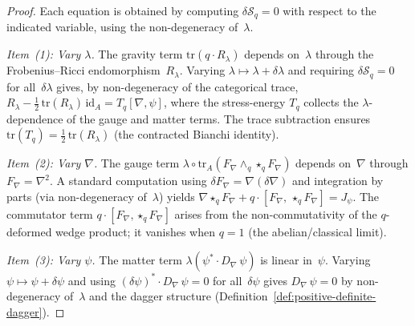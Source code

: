 \begin{proof}
Each equation is obtained by computing
$\delta\mathcal{S}_q = 0$ with respect to the indicated variable, using
the non-degeneracy of~$\lambda$.

\emph{Item~(1): Vary $\lambda$.}\;
The gravity term $\mathrm{tr}(q \cdot R_\lambda)$ depends on~$\lambda$
through the Frobenius--Ricci endomorphism~$R_\lambda$.  Varying
$\lambda \mapsto \lambda + \delta\lambda$ and requiring
$\delta\mathcal{S}_q = 0$ for all~$\delta\lambda$ gives, by
non-degeneracy of the categorical trace,
$R_\lambda - \tfrac{1}{2}\,\mathrm{tr}(R_\lambda)\,\mathrm{id}_A
= T_q[\nabla, \psi]$,
where the stress-energy $T_q$ collects the $\lambda$-dependence of the
gauge and matter terms.  The trace subtraction ensures
$\mathrm{tr}(T_q) = \tfrac{1}{2}\,\mathrm{tr}(R_\lambda)$ (the
contracted Bianchi identity).

\emph{Item~(2): Vary $\nabla$.}\;
The gauge term
$\lambda \circ \mathrm{tr}_A(F_\nabla \wedge_q \star_q F_\nabla)$
depends on~$\nabla$ through $F_\nabla = \nabla^2$.  A standard
computation using $\delta F_\nabla = \nabla(\delta\nabla)$ and
integration by parts (via non-degeneracy of~$\lambda$) yields
$\nabla \star_q F_\nabla + q \cdot [F_\nabla,\, \star_q F_\nabla]
= J_\psi$.
The commutator term $q \cdot [F_\nabla, \star_q F_\nabla]$ arises from
the non-commutativity of the $q$-deformed wedge product; it vanishes
when $q = 1$ (the abelian/classical limit).

\emph{Item~(3): Vary $\psi$.}\;
The matter term $\lambda(\psi^* \cdot D_\nabla\,\psi)$ is linear
in~$\psi$.  Varying $\psi \mapsto \psi + \delta\psi$ and using
$(\delta\psi)^* \cdot D_\nabla\,\psi = 0$ for
all~$\delta\psi$ gives $D_\nabla\,\psi = 0$ by non-degeneracy
of~$\lambda$ and the dagger structure
(Definition~\ref{def:positive-definite-dagger}).
\end{proof}


